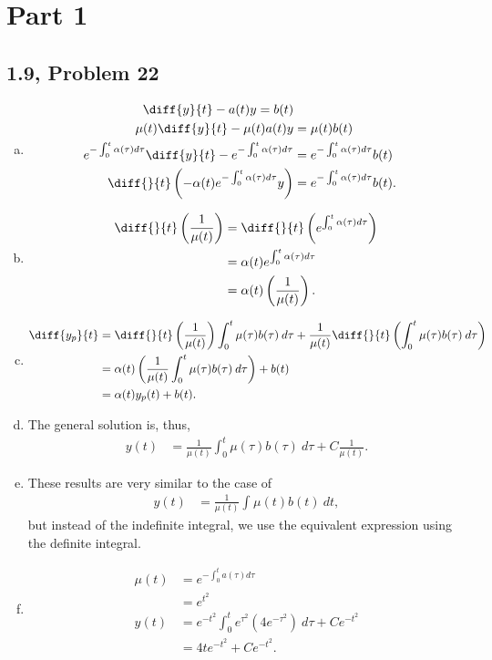 \documentclass[10pt]{mypackage}
\begin{document}
\RaggedRight
\section{Part 1}%
\subsection{1.9, Problem 22}%
\begin{enumerate}[(a)]
  \item 
    \begin{align*}
      \diff{y}{t} - a(t)y = b(t)\\
      \mu(t)\diff{y}{t}-\mu(t)a(t)y &= \mu(t)b(t)\\
      e^{-\int_{0}^{t}\alpha(\tau)d\tau}\diff{y}{t}-e^{-\int_{0}^{t}\alpha(\tau)d\tau} &= e^{-\int_{0}^{t}\alpha(\tau)d\tau}b(t)\\
      \diff{}{t}\left(-\alpha(t)e^{-\int_{0}^{t}\alpha(\tau)d\tau}y\right) &= e^{-\int_{0}^{t}\alpha(\tau)d\tau}b(t).
    \end{align*}
  \item 
    \begin{align*}
      \diff{}{t}\left(\frac{1}{\mu(t)}\right) &= \diff{}{t}\left(e^{\int_{0}^{t}\alpha(\tau)d\tau}\right)\\
                                              &= \alpha(t)e^{\int_{0}^{t}\alpha(\tau)d\tau}\\
                                              &= \alpha(t)\left(\frac{1}{\mu(t)}\right).
    \end{align*}
  \item 
    \begin{align*}
      \diff{y_p}{t} &= \diff{}{t}\left(\frac{1}{\mu(t)}\right)\int_{0}^{t} \mu(\tau)b(\tau)\:d\tau + \frac{1}{\mu(t)}\diff{}{t}\left(\int_{0}^{t} \mu(\tau)b(\tau)\:d\tau\right)\\
                    &= \alpha(t)\left(\frac{1}{\mu(t)}\int_{0}^{t} \mu(\tau)b(\tau)\:d\tau\right) + b(t)\\
                    &= \alpha(t)y_p(t) + b(t).
    \end{align*}
  \item The general solution is, thus,
    \begin{align*}
      y(t) &= \frac{1}{\mu(t)}\int_{0}^{t} \mu(\tau)b(\tau)\:d\tau + C\frac{1}{\mu(t)}.
    \end{align*}
  \item These results are very similar to the case of 
    \begin{align*}
      y(t) &= \frac{1}{\mu(t)}\int_{}^{} \mu(t)b(t)\:dt,
    \end{align*}
    but instead of the indefinite integral, we use the equivalent expression using the definite integral.
  \item 
    \begin{align*}
      \mu(t) &= e^{-\int_{0}^{t}a(\tau)d\tau}\\
             &= e^{t^2}\\
      y(t) &= e^{-t^2}\int_{0}^{t} e^{\tau^2}\left(4e^{-\tau^2}\right)\:d\tau + Ce^{-t^2}\\
           &= 4te^{-t^2} + Ce^{-t^2}.
    \end{align*}
\end{enumerate}
\end{document}
